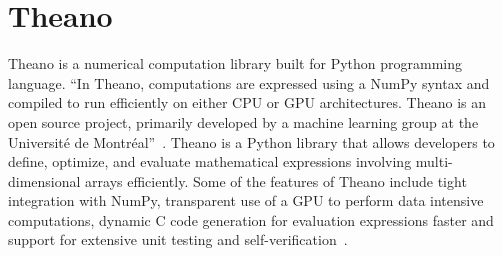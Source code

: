 \section{Theano}

Theano is a numerical computation library built for Python programming language. ``In Theano, computations are expressed using a NumPy syntax and compiled to run efficiently on either CPU or GPU architectures. Theano is an open source project, primarily developed by a machine learning group at the Université de Montréal''~\cite{hid-sp18-510-wiki-theano}. Theano is a Python library that allows developers to define, optimize, and evaluate mathematical expressions involving multi-dimensional arrays efficiently. Some of the features of Theano include tight integration with NumPy, transparent use of a GPU to perform data intensive computations, dynamic C code generation for evaluation expressions faster and support for extensive unit testing and self-verification~\cite{hid-sp18-510-web-theano}.
